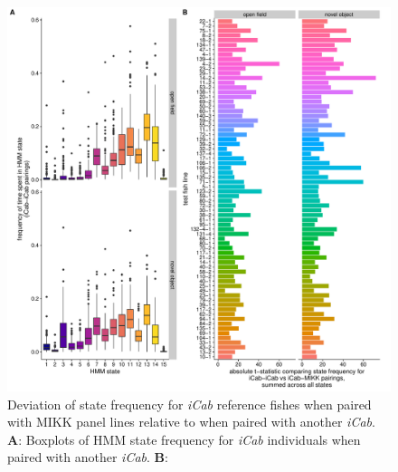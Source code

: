 \documentclass[
]{book}
\begin{document}
\begin{figure}
\includegraphics[width=1\linewidth]{figs/mikk_behaviour/0.08_15_deviation} \caption{Deviation of state frequency for \emph{\textcolor{iCab_424B4D}{iCab}} reference fishes when paired with MIKK panel lines relative to when paired with another \emph{\textcolor{iCab_424B4D}{iCab}}. \textbf{A}: Boxplots of HMM state frequency for \emph{\textcolor{iCab_424B4D}{iCab}} individuals when paired with another \emph{\textcolor{iCab_424B4D}{iCab}}. \textbf{B}:}\label{fig:F0-sge-deviation}
\end{figure}
\end{document}
